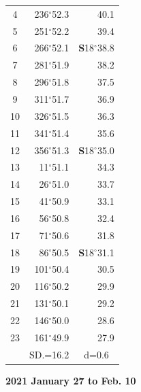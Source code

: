 \documentclass[10pt, a4paper]{report}
\begin{document}
\begin{scriptsize}
\begin{tabular*}{0.2\textwidth}[t]{@{\extracolsep{\fill}}|c|rr|}
4 & 236$^\circ$52.3 & 40.1\\
5 & 251$^\circ$52.2 & 39.4\\[2Pt]
6 & 266$^\circ$52.1 & \textbf{S}18$^\circ$38.8\\
7 & 281$^\circ$51.9 & 38.2\\
8 & 296$^\circ$51.8 & 37.5\\
9 & 311$^\circ$51.7 & \raisebox{0.24ex}{\boldmath$\cdot$~\boldmath$\cdot$~~}36.9\\
10 & 326$^\circ$51.5 & 36.3\\
11 & 341$^\circ$51.4 & 35.6\\[2Pt]
12 & 356$^\circ$51.3 & \textbf{S}18$^\circ$35.0\\
13 & 11$^\circ$51.1 & 34.3\\
14 & 26$^\circ$51.0 & 33.7\\
15 & 41$^\circ$50.9 & \raisebox{0.24ex}{\boldmath$\cdot$~\boldmath$\cdot$~~}33.1\\
16 & 56$^\circ$50.8 & 32.4\\
17 & 71$^\circ$50.6 & 31.8\\[2Pt]
18 & 86$^\circ$50.5 & \textbf{S}18$^\circ$31.1\\
19 & 101$^\circ$50.4 & 30.5\\
20 & 116$^\circ$50.2 & 29.9\\
21 & 131$^\circ$50.1 & \raisebox{0.24ex}{\boldmath$\cdot$~\boldmath$\cdot$~~}29.2\\
22 & 146$^\circ$50.0 & 28.6\\
23 & 161$^\circ$49.9 & 27.9\\
\hline
\rule{0pt}{2.4ex} & \multicolumn{1}{c}{SD.=16.2} & \multicolumn{1}{c|}{d=0.6}\\
\hline
\end{tabular*}

\end{scriptsize}
\newpage
\sffamily
\noindent
\begin{flushright}
\textbf{2021 January 27 to Feb. 10}\par
\end{flushright}
\end{document}
